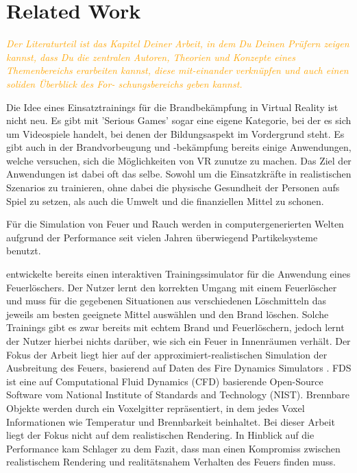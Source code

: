 \section{Related Work}

\emph{
    \textcolor{orange}{
        Der Literaturteil ist das Kapitel Deiner Arbeit, in dem Du Deinen Prüfern zeigen kannst, dass Du die zentralen Autoren, Theorien und Konzepte eines Themenbereichs erarbeiten kannst, diese mit-einander verknüpfen und auch einen soliden Überblick des For- schungsbereichs geben kannst.
    }
}


Die Idee eines Einsatztrainings für die Brandbekämpfung in Virtual Reality ist nicht neu. Es gibt mit
'Serious Games' sogar eine eigene Kategorie, bei der es sich um Videospiele handelt, bei denen der
Bildungsaspekt im Vordergrund steht. Es gibt auch in der Brandvorbeugung und -bekämpfung bereits einige Anwendungen, 
welche versuchen, sich die Möglichkeiten von VR zunutze zu machen.
Das Ziel der Anwendungen ist dabei oft das selbe. Sowohl um die Einsatzkräfte in realistischen Szenarios zu trainieren, 
ohne dabei die physische Gesundheit der Personen aufs Spiel zu setzen, als auch die Umwelt und die finanziellen Mittel zu schonen.


Für die Simulation von Feuer und Rauch werden in computergenerierten Welten aufgrund der Performance seit vielen Jahren überwiegend 
Partikelsysteme benutzt. \parencite{Reeves1983}



\parencite{Bukowski1997} 





\parencite{Schlager2017} entwickelte bereits einen interaktiven Trainingssimulator für die Anwendung eines Feuerlöschers.
Der Nutzer lernt den korrekten Umgang mit einem Feuerlöscher und muss für die gegebenen Situationen aus verschiedenen Löschmitteln das
jeweils am besten geeignete Mittel auswählen und den Brand löschen.
Solche Trainings gibt es zwar bereits mit echtem Brand und Feuerlöschern, jedoch lernt der Nutzer hierbei nichts darüber,
wie sich ein Feuer in Innenräumen verhält.
Der Fokus der Arbeit liegt hier auf der approximiert-realistischen Simulation der Ausbreitung des Feuers,
basierend auf Daten des Fire Dynamics Simulators \parencite{FDS2004}.
FDS ist eine auf Computational Fluid Dynamics (CFD) basierende Open-Source Software vom National Institute of Standards and Technology (NIST).
Brennbare Objekte werden durch ein Voxelgitter repräsentiert, in dem jedes Voxel Informationen wie Temperatur und Brennbarkeit beinhaltet.
Bei dieser Arbeit liegt der Fokus nicht auf dem realistischen Rendering.
In Hinblick auf die Performance kam Schlager zu dem Fazit, dass man einen Kompromiss zwischen realistischem Rendering und 
realitätsnahem Verhalten des Feuers finden muss.



